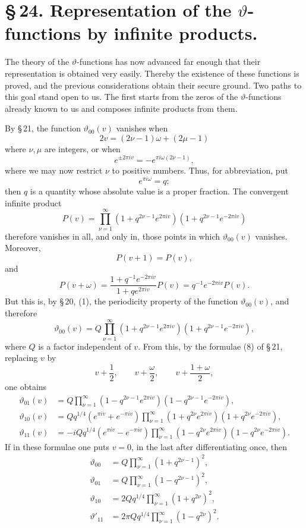 \documentclass[11pt]{article}
\newcommand{\tht}{\vartheta}
\begin{document}
\section*{\S\,24. Representation of the $\vartheta$-functions by infinite products.}

The theory of the $\vartheta$-functions has now advanced far enough that their representation is obtained very easily. Thereby the existence of these functions is proved, and the previous considerations obtain their secure ground. Two paths to this goal stand open to us. The first starts from the zeros of the $\vartheta$-functions already known to us and composes infinite products from them.

By \S\,21, the function $\tht_{00}(v)$ vanishes when
\[
2v=(2\nu-1)\omega+(2\mu-1)
\]
where $\nu,\mu$ are integers, or when
\[
e^{\pm 2\pi iv}=-e^{\pi i\omega(2\nu-1)},
\]
where we may now restrict $\nu$ to positive numbers. Thus, for abbreviation, put
\[
e^{\pi i\omega}=q;
\]
then $q$ is a quantity whose absolute value is a proper fraction. The convergent infinite product
\[
P(v)=\prod_{\nu=1}^{\infty}(1+q^{2\nu-1}e^{2\pi iv})(1+q^{2\nu-1}e^{-2\pi iv})
\]
therefore vanishes in all, and only in, those points in which $\tht_{00}(v)$ vanishes. Moreover,
\[
P(v+1)=P(v),
\]
and
\[
P(v+\omega)=\frac{1+q^{-1}e^{-2\pi iv}}{1+qe^{2\pi iv}}P(v)=q^{-1}e^{-2\pi iv}P(v).
\]
But this is, by \S\,20, (1), the periodicity property of the function $\tht_{00}(v)$, and therefore
\begin{equation}
\tht_{00}(v)=Q\prod_{\nu=1}^{\infty}(1+q^{2\nu-1}e^{2\pi iv})(1+q^{2\nu-1}e^{-2\pi iv}),
\tag{1}
\end{equation}
where $Q$ is a factor independent of $v$. From this, by the formulae (8) of \S\,21, replacing $v$ by
\[
v+\frac12,\qquad v+\frac\omega2,\qquad v+\frac{1+\omega}{2},
\]
one obtains
\begin{align}
\tht_{01}(v)&=Q\prod_{\nu=1}^{\infty}(1-q^{2\nu-1}e^{2\pi iv})(1-q^{2\nu-1}e^{-2\pi iv}), \tag{2}\\
\tht_{10}(v)&=Qq^{1/4}(e^{\pi iv}+e^{-\pi iv})\prod_{\nu=1}^{\infty}(1+q^{2\nu}e^{2\pi iv})(1+q^{2\nu}e^{-2\pi iv}), \tag{3}\\
\tht_{11}(v)&=-iQq^{1/4}(e^{\pi iv}-e^{-\pi iv})\prod_{\nu=1}^{\infty}(1-q^{2\nu}e^{2\pi iv})(1-q^{2\nu}e^{-2\pi iv}). \tag{4}
\end{align}
If in these formulae one puts $v=0$, in the last after differentiating once, then
\begin{equation}
\begin{aligned}
\tht_{00}&=Q\prod_{\nu=1}^{\infty}(1+q^{2\nu-1})^2,\\
\tht_{01}&=Q\prod_{\nu=1}^{\infty}(1-q^{2\nu-1})^2,\\
\tht_{10}&=2Qq^{1/4}\prod_{\nu=1}^{\infty}(1+q^{2\nu})^2,\\
\tht'_{11}&=2\pi Qq^{1/4}\prod_{\nu=1}^{\infty}(1-q^{2\nu})^2.
\end{aligned}
\tag{5}
\end{equation}
\end{document}
